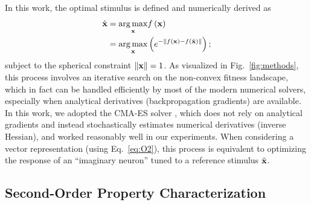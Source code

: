 \documentclass[10pt,twocolumn,letterpaper]{article}
\begin{document}
In this work, the optimal stimulus is defined and numerically derived as 
\begin{align}
\hat{\bf{x}} &= \underset{\bf{x}} {\arg\max} f\left(\bf{x}\right) \label{eq:O1} \\
&= \underset{\bf{x}}{\arg\max} \left( e^{-\left\|f\left(\bf{x}\right)-f\left(\tilde{\bf{x}}\right)\right\|} \right); \label{eq:O2}
\end{align}
subject to the spherical constraint $\left\| \bf{x} \right\| = 1$. 
As visualized in Fig.~\ref{fig:methods}, this process involves an iterative search on the non-convex fitness landscape, which in fact can be handled efficiently by most of the modern numerical solvers, especially when analytical derivatives (\ie backpropagation gradients) are available.
In this work, we adopted the CMA-ES solver \cite{hansen2001completely}, which does not rely on analytical gradients and instead stochastically estimates numerical derivatives (\ie inverse Hessian), and worked reasonably well in our experiments.
When considering a vector representation (using Eq.~\ref{eq:O2}), this process is equivalent to optimizing the response of an ``imaginary neuron'' tuned to a reference stimulus $\tilde{\bf{x}}$.


\subsection{Second-Order Property Characterization}

\newcommand{\expdiff}{The way the simple linear constraint is constructed to enforce the exploration of a larger extent of the fitness landscape is also one of the main differences compared to \cite{erhan2010understanding}.}
\end{document}
